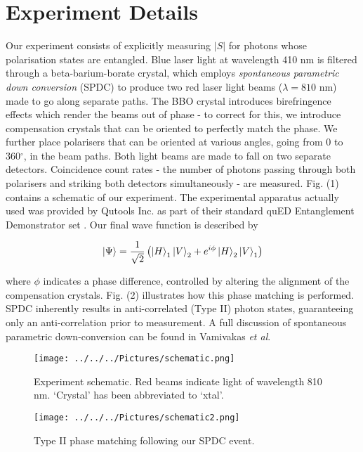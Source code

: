 \documentclass[aps,prl,nofootinbib,twocolumn,superscriptaddress,groupedaddress]{revtex4}  %
\begin{document}
\section{Experiment Details}
Our experiment consists of explicitly measuring $\lvert S \rvert$ for photons whose polarisation states are entangled. Blue laser light at wavelength 410 nm is filtered through a beta-barium-borate crystal, which employs \textit{spontaneous parametric down conversion} (SPDC) to produce two red laser light beams ($\lambda = 810$ nm) made to go along separate paths. The BBO crystal introduces birefringence effects which render the beams out of phase - to correct for this, we introduce compensation crystals that can be oriented to perfectly match the phase. We further place   polarisers that can be oriented at various angles, going from 0 to 360$^{\circ}$, in the beam paths. Both light beams are made to fall on two separate detectors. Coincidence count rates - the number of photons passing through both polarisers and striking both detectors simultaneously - are measured. Fig. (1) contains a schematic of our experiment. The experimental apparatus actually used was provided by Qutools Inc. as part of their standard quED Entanglement Demonstrator set \cite{qued}. Our final wave function is described by

\begin{equation}
\ket{\Psi} = \dfrac{1}{\sqrt{2}}\left(\ket{H}_{1}\ket{V}_{2} + e^{i\phi} \ket{H}_{2}\ket{V}_{1}\right)
\end{equation}

where $\phi$ indicates a phase difference, controlled by altering the alignment of the compensation crystals. Fig. (2) illustrates how this phase matching is performed. SPDC inherently results in anti-correlated (Type II) photon states, guaranteeing only an anti-correlation prior to measurement. A full discussion of spontaneous parametric down-conversion can be found in Vamivakas \textit{et al}\cite{spdc}.

\begin{figure}[t]
\texttt{[image: ../../../Pictures/schematic.png]}
\caption{Experiment schematic\cite{qued}. Red beams indicate light of wavelength 810 nm. `Crystal' has been abbreviated to `xtal'.}
\end{figure}

\begin{figure}[b]
\texttt{[image: ../../../Pictures/schematic2.png]}
\caption{Type II phase matching following our SPDC event.}
\end{figure}
\end{document}
